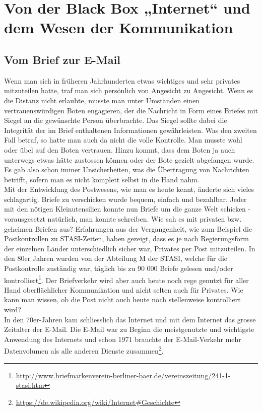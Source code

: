 \newpage
\section{Von der Black Box „Internet“ und dem Wesen der Kommunikation}

\subsection{Vom Brief zur E-Mail}
Wenn man sich in früheren Jahrhunderten etwas wichtiges und sehr privates mitzuteilen hatte, traf man sich persönlich von Angesicht zu Angesicht. Wenn es die Distanz nicht erlaubte, musste man unter Umständen einen vertrauenswürdigen Boten engagieren, der die Nachricht in Form eines Briefes mit Siegel an die gewünschte Person überbrachte. Das Siegel sollte dabei die Integrität der im Brief enthaltenen Informationen gewährleisten. Was den zweiten Fall betraf, so hatte man auch da nicht die volle Kontrolle. Man musste wohl oder übel auf den Boten vertrauen. Hinzu kommt, dass dem Boten ja auch unterwegs etwas hätte zustossen können oder der Bote gezielt abgefangen wurde. Es gab also schon immer Unsicherheiten, was die Übertragung von Nachrichten betrifft, sofern man es nicht komplett selbst in die Hand nahm. 
\\
Mit der Entwicklung des Postwesens, wie man es heute kennt, änderte sich vieles schlagartig. Briefe zu verschicken wurde bequem, einfach und bezahlbar. Jeder mit den nötigen Kleinutensilien konnte nun Briefe um die ganze Welt schicken - vorausgesetzt natürlich, man konnte schreiben. Wie sah es mit privaten bzw. geheimen Briefen aus? Erfahrungen aus der Vergangenheit, wie zum Beispiel die Postkontrollen zu STASI-Zeiten, haben gezeigt, dass es je nach Regierungsform der einzelnen Länder unterschiedlich sicher war, Privates per Post mitzuteilen. In den 80er Jahren wurden von der Abteilung M der STASI, welche für die Postkontrolle zuständig war, täglich bis zu 90 000 Briefe gelesen und/oder kontrolliert\footnote{\url{http://www.briefmarkenverein-berliner-baer.de/vereinszeitung/241-1-stasi.htm}}.
Der Briefverkehr wird aber auch heute noch rege genutzt für aller Hand oberflächlicher Kommunikation und nicht selten auch für Privates. Wie kann man wissen, ob die Post nicht auch heute noch stellenweise kontrolliert wird?
\\
In den 70er-Jahren kam schliesslich das Internet und mit dem Internet das grosse Zeitalter der E-Mail. Die E-Mail war zu Beginn die meistgenutzte und wichtigste Anwendung des Internets und schon 1971 brauchte der E-Mail-Verkehr mehr Datenvolumen als alle anderen Dienste zusammen\footnote{\url{https://de.wikipedia.org/wiki/Internet\#Geschichte}}.
